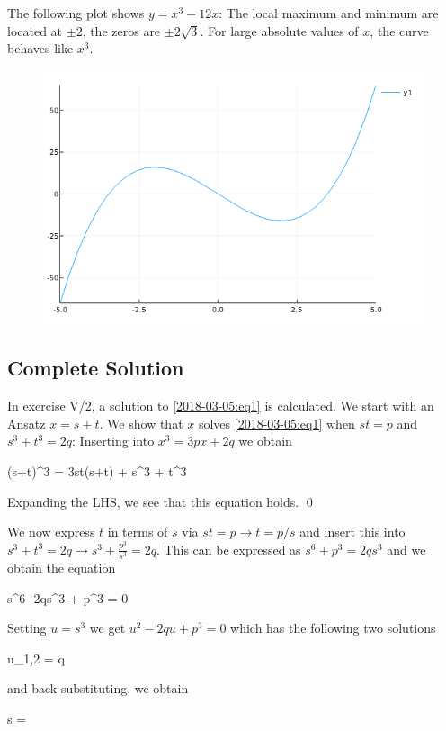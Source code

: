 The following plot shows $y=x^3 - 12x$: The local maximum and minimum are located at $\pm2$, the zeros are $\pm 2 \sqrt{3}$. For large absolute values of $x$, the curve behaves like $x^3$.

\begin{figure}[H]
	\includegraphics[scale=0.7]{images/cubic_01.png}
\end{figure}

\subsection{Complete Solution}

In exercise V/2, a solution to \eqref{2018-03-05:eq1} is calculated. We start with an Ansatz $x = s+t$. We show that $x$ solves \eqref{2018-03-05:eq1} when $st=p$ and $s^3 + t^3 = 2q$: Inserting into $x^3 = 3px + 2q$ we obtain

\bee
(s+t)^3 = 3st(s+t) + s^3 + t^3
\eee

Expanding the LHS, we see that this equation holds. \qed

We now express $t$ in terms of $s$ via $st=p \rightarrow t = p/s$ and insert this into $s^3 + t^3 = 2q \rightarrow s^3 + \frac{p^3}{s^3} = 2q$. This can be expressed as $s^6 + p^3 = 2qs^3$ and we obtain the equation

\bee
s^6 -2qs^3 + p^3 = 0
\eee

Setting $u = s^3$ we get $u^2 - 2qu + p^3 = 0$ which has the following two solutions

\bee
u_{1,2} = q \pm {}
\eee

and back-substituting, we obtain

\bee
s = 
\eee

